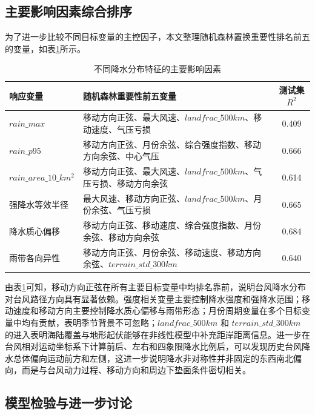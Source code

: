 \documentclass[UTF8,a4paper,zihao=5,fontset=fandol]{ctexart}
\numberwithin{equation}{section}
\numberwithin{figure}{section}
\numberwithin{table}{section}
\begin{document}
\subsection{主要影响因素综合排序}

为了进一步比较不同目标变量的主控因子，本文整理随机森林置换重要性排名前五的变量，如表\ref{tab:rf_top_factors_problem1}所示。

\begin{table}[htbp]
    \centering
    \caption{不同降水分布特征的主要影响因素}
    \label{tab:rf_top_factors_problem1}
    \begin{tabular}{p{}p{}c}
        \hline
        响应变量 & 随机森林重要性前五变量 & 测试集$R^2$ \\
        \hline
        $rain\_max$ & 移动方向正弦、最大风速、$landfrac\_500km$、移动速度、气压亏损 & 0.409 \\
        $rain\_p95$ & 移动方向正弦、月份余弦、综合强度指数、移动方向余弦、中心气压 & 0.666 \\
        $rain\_area\_10\_km^2$ & 移动方向正弦、最大风速、$landfrac\_500km$、气压亏损、移动方向余弦 & 0.614 \\
        强降水等效半径 & 最大风速、移动方向正弦、$landfrac\_500km$、月份余弦、气压亏损 & 0.665 \\
        降水质心偏移 & 移动方向正弦、移动速度、综合强度指数、月份余弦、移动方向余弦 & 0.684 \\
        雨带各向异性 & 移动方向正弦、月份余弦、移动速度、移动方向余弦、$terrain\_std\_300km$ & 0.640 \\
        \hline
    \end{tabular}
\end{table}

由表\ref{tab:rf_top_factors_problem1}可知，移动方向正弦在所有主要目标变量中均排名靠前，说明台风降水分布对台风路径方向具有显著依赖。强度相关变量主要控制降水强度和强降水范围；移动速度和移动方向主要控制降水质心偏移与雨带形态；月份周期变量在多个目标变量中均有贡献，表明季节背景不可忽略；$landfrac\_500km$ 和 $terrain\_std\_300km$ 的进入表明海陆覆盖与地形起伏能够在非线性模型中补充距岸距离信息。进一步在台风相对运动坐标系下计算前后、左右和四象限降水比例后，可以发现历史台风降水总体偏向运动前方和左侧，这进一步说明降水非对称性并非固定的东西南北偏向，而是与台风动力过程、移动方向和周边下垫面条件密切相关。

\subsection{模型检验与进一步讨论}
\end{document}
